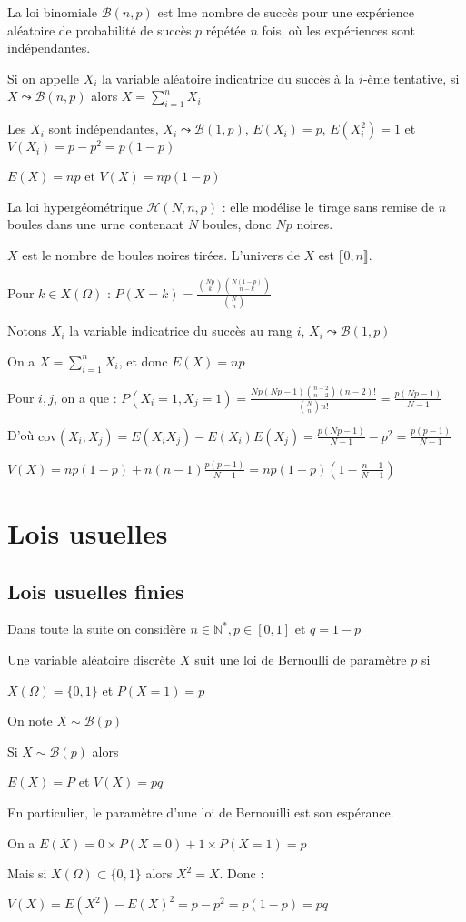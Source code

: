 \documentclass[a4paper,12pt]{book}
\newcommand{\Def}[2]{\begin{tcolorbox}[sharp corners, colback=white,colframe=blue!90!black!75, title=Définition : #1]#2\end{tcolorbox}}
\newcommand{\Prop}[2]{\begin{tcolorbox}[sharp corners, colback=white,colframe=red!90!black!75, title=Proposition : #1]#2\end{tcolorbox}}
\newcommand{\Pre}[1]{\begin{tcolorbox}[sharp corners, colback=white,colframe=green!60!green!30!black!75, title=Preuve]#1\end{tcolorbox}}
\def\N{\mathbb{N}}
\begin{document}
La loi binomiale $\mathcal{B}(n,p)$ est lme nombre de succès pour une expérience aléatoire de probabilité de succès $p$ répétée $n$ fois, où les expériences sont indépendantes.
\par Si on appelle $X_i$ la variable aléatoire indicatrice du succès à la $i$-ème tentative, si $X\leadsto \mathcal{B}(n,p)$ alors $X=\sum\limits_{i=1}^n X_i$
\par Les $X_i$ sont indépendantes, $X_i\leadsto \mathcal{B}(1,p)$, $E(X_i) = p$, $E(X_i^2)=1$ et $V(X_i) = p - p^2 = p(1-p)$
\par $E(X) = np$ et $V(X)=np(1-p)$
\par La loi hypergéométrique $\mathcal{H}(N, n, p)$ : elle modélise le tirage sans remise de $n$ boules dans une urne contenant $N$ boules, donc $Np$ noires.
\par $X$ est le nombre de boules noires tirées. L'univers de $X$ est $\llbracket 0, n\rrbracket$.
\par Pour $k\in X(\Omega)$ : $P(X=k) = \frac{\binom{Np}{k}\binom{N(1-p)}{n-k}}{\binom{N}{n}}$
\par Notons $X_i$ la variable indicatrice du succès au rang $i$, $X_i\leadsto \mathcal{B}(1,p)$
\par On a $X=\sum\limits_{i=1}^n X_i$, et donc $E(X) = np$
\par Pour $i,j$, on a que : $P(X_i=1, X_j=1) = \frac{Np(Np-1)\binom{n-2}{n-2}(n-2)!}{\binom{N}{n}n!} = \frac{p(Np-1)}{N-1}$
\par D'où $\mathrm{cov}(X_i, X_j) = E(X_iX_j) - E(X_i)E(X_j) = \frac{p(Np-1)}{N-1} - p^2 = \frac{p(p-1)}{N-1}$
\par $V(X) = np(1-p) + n(n-1)\frac{p(p-1)}{N-1} = np(1-p)\left(1-\frac{n-1}{N-1}\right)$




\section{Lois usuelles}
\subsection{Lois usuelles finies}
Dans toute la suite on considère $n\in\N^*, p\in[0,1]$ et $q=1-p$
\Def{}{Une variable aléatoire discrète $X$ suit une loi de Bernoulli de paramètre $p$ si
\par\begin{center}$X(\Omega)=\{0,1\}$ et $P(X=1)=p$\end{center}
\par On note $X\sim\mathcal{B}(p)$}
\Prop{}{Si $X\sim\mathcal{B}(p)$ alors
\par\begin{center}$E(X)=P$ et $V(X)=pq$\end{center}
En particulier, le paramètre d'une loi de Bernouilli est son espérance.}
\Pre{On a $E(X) = 0 \times P(X=0) + 1\times P(X=1) = p$
\par Mais si $X(\Omega)\subset\{0,1\}$ alors $X^2=X$. Donc :
\par $V(X)=E(X^2)-E(X)^2= p - p^2 = p(1-p)=pq$}
\end{document}
